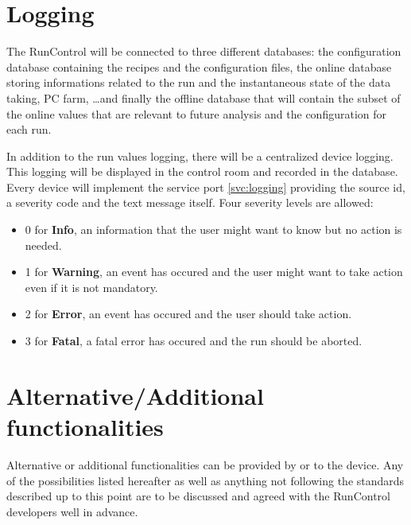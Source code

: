 \documentclass[a4paper]{article}
\begin{document}
\section{Logging}\label{sec:logging}
The RunControl will be connected to three different databases: the configuration database containing
the recipes and the configuration files, the online database storing informations related to the
run and the instantaneous state of the data taking, PC farm, \ldots and finally the offline
database that will contain the subset of the online values that are relevant to future analysis and
the configuration for each run.

In addition to the run values logging, there will be a centralized device logging. This logging will
be displayed in the control room and recorded in the database. Every device will implement the
service port \ref{svc:logging} providing the source id, a severity code and the
text message itself. Four severity levels are allowed:
\begin{itemize}
  \item 0 for \textbf{Info}, an information that the user might want to know but
  no action is needed.
  \item 1 for \textbf{Warning}, an event has occured and the user might want to
  take action even if it is not mandatory.
  \item 2 for \textbf{Error}, an event has occured and the user should take
  action.
  \item 3 for \textbf{Fatal}, a fatal error has occured and the run should be
  aborted.
\end{itemize}

\section{Alternative/Additional functionalities}
Alternative or additional functionalities can be provided by or to the device. Any of the
possibilities listed hereafter as well as anything not following the standards described
up to this point are to be discussed and agreed with the RunControl developers well in advance.
\end{document}
